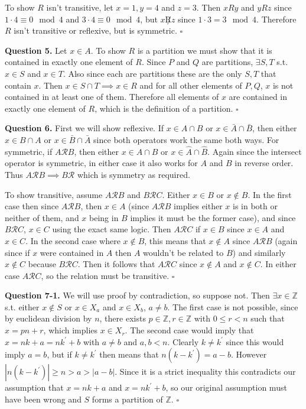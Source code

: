 \documentclass[letterpaper, reqno,11pt]{article}
\newcommand{\ZZ}{\mathbb{Z}}
\begin{document}
To show $R$ isn't transitive, let $x=1, y=4$ and $z=3$. Then $xRy$ and $yRz$ since $1\cdot 4\equiv 0\mod4$ and $3\cdot 4\equiv 0\mod4$, but $x\not Rz$ since $1\cdot 3=3\mod4$. Therefore $R$ isn't transitive or reflexive, but is symmetric. $\square$

{\noindent\bf Question 5.} Let $x\in A$. To show $R$ is a partition we must show that it is contained in exactly one element of $R$. Since $P$ and $Q$ are partitions, $\exists S, T$ s.t. $x\in S$ and $x\in T$. Also since each are partitions these are the only $S, T$ that contain $x$. Then $x\in S\cap T\implies x\in R$ and for all other elements of $P, Q$, $x$ is not contained in at least one of them. Therefore all elements of $x$ are contained in exactly one element of $R$, which is the definition of a partition. $\square$

{\noindent\bf Question 6.} First we will show reflexive. If $x\in A\cap B$ or $x\in\bar A\cap\bar B$, then either $x\in B\cap A$ or $x\in\bar B\cap \bar A$ since both operators work the same both ways. For symmetric, if $A\mathcal{R}B$, then either $x\in A\cap B$ or $x\in\hat A\cap\hat B$. Again since the intersect operator is symmetric, in either case it also works for $A$ and $B$ in reverse order. Thus $A\mathcal{R}B\implies B\mathcal{R}$ which is symmetry as required. 

To show transitive, assume $A\mathcal{R}B$ and $B\mathcal{R}C$. Either $x\in B$ or $x\notin B$. In the first case then since $A\mathcal{R}B$, then $x\in A$ (since $A\mathcal{R}B$ implies either $x$ is in both or neither of them, and $x$ being in $B$ implies it must be the former case), and since $B\mathcal{R}C$, $x\in C$ using the exact same logic. Then $A\mathcal{R}C$ if $x\in B$ since $x\in A$ and $x\in C$. In the second case where $x\notin B$, this means that $x\notin A$ since $A\mathcal{R}B$ (again since if $x$ were contained in $A$ then $A$ wouldn't be related to $B$) and similarly $x\notin C$ because $B\mathcal{R}C$. Then it follows that $A\mathcal{R}C$ since $x\notin A$ and $x\notin C$. In either case $A\mathcal{R}C$, so the relation must be transitive. $\square$

{\noindent\bf Question 7-1.} We will use proof by contradiction, so suppose not. Then $\exists x\in\ZZ$ s.t. either $x\notin S$ or $x\in X_a$ and $x\in X_b$, $a\neq b$. The first case is not possible, since by euclidean division by $n$, there exists $p\in\ZZ,r\in\ZZ$ with $0\leq r<n$ such that $x=pn+r$, which implies $x\in X_r$. The second case would imply that $x=nk+a=nk^\prime+b$ with $a\neq b$ and $a, b<n$. Clearly $k\neq k^\prime$ since this would imply $a=b$, but if $k\neq k^\prime$ then means that $n(k-k^\prime)=a-b$. However $|n(k-k^\prime)|\geq n > a > |a-b|$. Since it is a strict inequality this contradicts our assumption that $x=nk+a$ and $x=nk^\prime+b$, so our original assumption must have been wrong and $S$ forms a partition of $\ZZ$. $\square$
\end{document}
